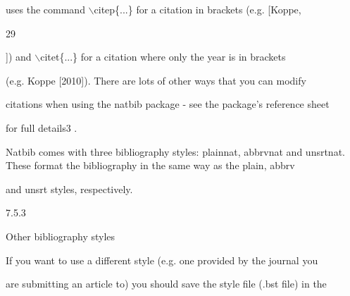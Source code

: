 \documentclass[a4paper,portrait,12pt]{article}
\begin{document}
\begin{flushleft}
uses the command \ensuremath{\backslash}citep\{...\} for a citation in brackets (e.g. [Koppe,
\end{flushleft}


29





\begin{flushleft}
]) and \ensuremath{\backslash}citet\{...\} for a citation where only the year is in brackets
\end{flushleft}


\begin{flushleft}
(e.g. Koppe [2010]). There are lots of other ways that you can modify
\end{flushleft}


\begin{flushleft}
citations when using the natbib package - see the package's reference sheet
\end{flushleft}


\begin{flushleft}
for full details3 .
\end{flushleft}


\begin{flushleft}
Natbib comes with three bibliography styles: plainnat, abbrvnat and unsrtnat. These format the bibliography in the same way as the plain, abbrv
\end{flushleft}


\begin{flushleft}
and unsrt styles, respectively.
\end{flushleft}





7.5.3





\begin{flushleft}
Other bibliography styles
\end{flushleft}





\begin{flushleft}
If you want to use a different style (e.g. one provided by the journal you
\end{flushleft}


\begin{flushleft}
are submitting an article to) you should save the style file (.bst file) in the
\end{flushleft}
\end{document}
